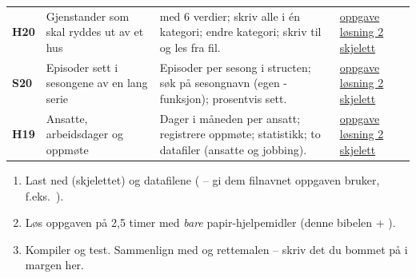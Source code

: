 \begin{center}
\begin{longtable}{@{}L{0.9cm}L{4.0cm}L{8.6cm}L{1.8cm}@{}}
\textbf{H20} & Gjenstander som skal ryddes ut av et hus &  med 6 verdier; skriv alle i én kategori; endre kategori; skriv til og les fra fil. & \href{https://frh.folk.ntnu.no/grprog/eksamen/ex_h20.pdf}{oppgave} \newline \href{https://frh.folk.ntnu.no/grprog/eksamen/ex_h20_2.c}{løsning 2} \newline \href{https://frh.folk.ntnu.no/grprog/eksamen/ex_h20_2.tpl}{skjelett} \\
\textbf{S20} & Episoder sett i sesongene av en lang serie & Episoder per sesong i structen; søk på sesongnavn (egen -funksjon); prosentvis sett. & \href{https://frh.folk.ntnu.no/grprog/eksamen/ex_s20.pdf}{oppgave} \newline \href{https://frh.folk.ntnu.no/grprog/eksamen/ex_s20_2.c}{løsning 2} \newline \href{https://frh.folk.ntnu.no/grprog/eksamen/ex_s20_2.tpl}{skjelett} \\
\textbf{H19} & Ansatte, arbeidsdager og oppmøte & Dager i måneden per ansatt; registrere oppmøte; statistikk; to datafiler (ansatte og jobbing). & \href{https://frh.folk.ntnu.no/grprog/eksamen/ex_h19.pdf}{oppgave} \newline \href{https://frh.folk.ntnu.no/grprog/eksamen/ex_h19_2.c}{løsning 2} \newline \href{https://frh.folk.ntnu.no/grprog/eksamen/ex_h19_2.tpl}{skjelett} \\
\bottomrule
\end{longtable}
\end{center}

\begin{tips}
\begin{enumerate}
  \item Last ned  (skjelettet) og datafilene ( -- gi dem filnavnet oppgaven bruker, f.eks.\ ).
  \item Løs oppgaven på 2,5 timer med \emph{bare} papir-hjelpemidler (denne bibelen + ).
  \item Kompiler og test. Sammenlign med  og rettemalen -- skriv det du bommet på i margen her.
\end{enumerate}
\end{tips}
